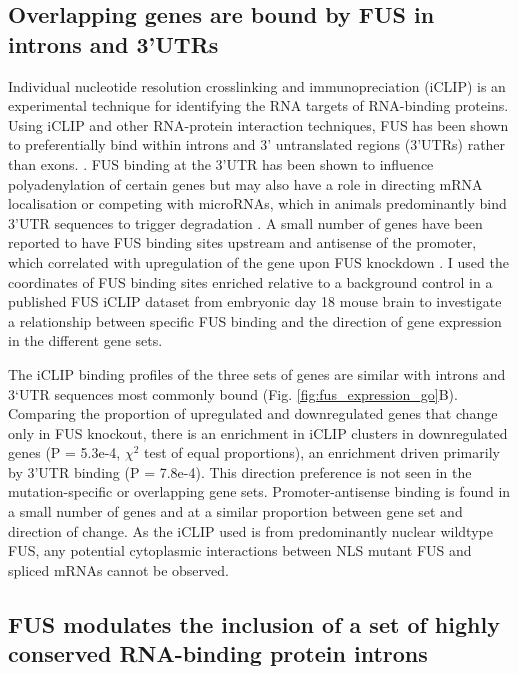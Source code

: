 \subsection{ Overlapping genes are bound by FUS in introns and 3'UTRs}

Individual nucleotide resolution crosslinking and immunopreciation (iCLIP) is an experimental technique for identifying the RNA targets of RNA-binding proteins. 
Using iCLIP and other RNA-protein interaction techniques, FUS has been shown to preferentially bind within introns and 3' untranslated regions (3'UTRs) rather than exons. \citep{Lagier-Tourenne2012-wa, Rogelj2012, Ishigaki2012, Masuda2015, Kapeli2016}. 
FUS binding at the 3'UTR has been shown to influence polyadenylation of certain genes \citep{Masuda2015} but may also have a role in directing mRNA localisation or competing with microRNAs, which in animals predominantly bind 3'UTR sequences to trigger degradation \citep{Lee1993,Carthew2009}.
A small number of genes have been reported to have FUS binding  sites upstream and antisense of the promoter, which correlated with upregulation of the gene upon FUS knockdown \citep{Ishigaki2012}.
I used the coordinates of FUS binding sites enriched relative to a background control in a published FUS iCLIP dataset from embryonic day 18 mouse brain \citep{Rogelj2012} to investigate a relationship between specific FUS binding and the direction of gene expression in the different gene sets.

The iCLIP binding profiles of the three sets of genes are similar with introns and 3`UTR sequences most commonly bound (Fig. \ref{fig:fus_expression_go}B).  
Comparing the proportion of upregulated and downregulated genes that change only in FUS knockout, there is an enrichment in iCLIP clusters in downregulated genes (P = 5.3e-4, $\chi^2$ test of equal proportions), an enrichment driven primarily by 3'UTR binding (P = 7.8e-4). 
This direction preference is not seen in the mutation-specific or overlapping gene sets.
Promoter-antisense binding is found in a small number of genes and at a similar proportion between gene set and direction of change.
As the iCLIP used is from predominantly nuclear wildtype FUS, any potential cytoplasmic interactions between NLS mutant FUS and spliced mRNAs cannot be observed.



\subsection{FUS modulates the inclusion of a set of highly conserved RNA-binding protein introns}

